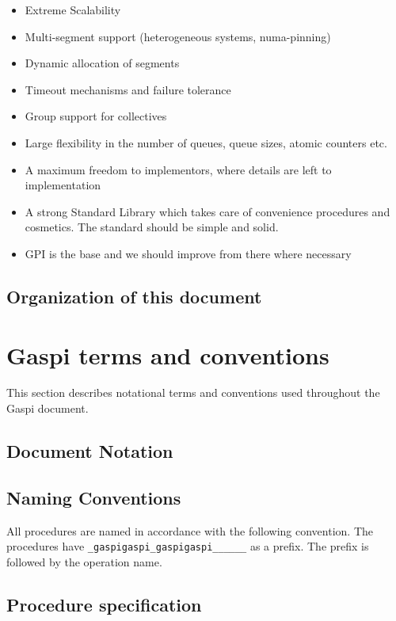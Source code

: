 \documentclass{article}
\makeatletter
\newlength{\st}\setlength{\st}{0pt}
\newcommand{\zerowsep}{\hskip 0pt plus 0.1pt minus 0.1pt}
\newcommand{\ZSEP}[1]{\ifx#1\@@@EOZ@@@\let\next\relax\else\ifx#1\_#1\zerowsep\else#1\fi\let\next\ZSEP\fi\next}
\newcommand{\zsep}[1]{\ZSEP{}#1\@@@EOZ@@@}
\newcommand{\gaspiprefix}{gaspi}
\newcommand{\GASPI}{{\sc Gaspi}}
\newcommand{\function}[1]{{\tt #1}}
\newcommand{\gaspifunction}[1]{\function{\protect\zsep{\gaspiprefix\_#1}}}
\makeatother
\begin{document}
\begin{itemize}
\item Extreme Scalability
\item Multi-segment support (heterogeneous systems, numa-pinning)
\item Dynamic allocation of segments
\item Timeout mechanisms and failure tolerance
\item Group support for collectives
\item Large flexibility in the number of queues, queue sizes, 
  atomic counters etc.
\item A maximum freedom to implementors, where details are left to 
  implementation
\item A strong Standard Library which takes care of convenience
  procedures and cosmetics. The standard should be simple and solid.
\item GPI is the base and we should improve from there where necessary
\end{itemize}

\subsection{Organization of this document}


\section{\GASPI{} terms and conventions}

This section describes notational terms and conventions used throughout the \GASPI{}
document.

\subsection{Document Notation}

\subsection{Naming Conventions}

All procedures are named in accordance with the following convention.
The procedures have \gaspifunction{} as a prefix. The prefix
is followed by the operation name.


\subsection{Procedure specification}
\end{document}
